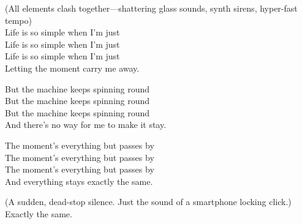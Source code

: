 \begin{lyrics}
(All elements clash together—shattering glass sounds, synth sirens, hyper-fast tempo)\\
Life is so simple when I’m just\\
Life is so simple when I’m just\\
Life is so simple when I’m just\\
Letting the moment carry me away.

But the machine keeps spinning round\\
But the machine keeps spinning round\\
But the machine keeps spinning round\\
And there’s no way for me to make it stay.

The moment’s everything but passes by\\
The moment’s everything but passes by\\
The moment’s everything but passes by\\
And everything stays exactly the same.

(A sudden, dead-stop silence. Just the sound of a smartphone locking click.)\\
Exactly the same.
\end{lyrics}

